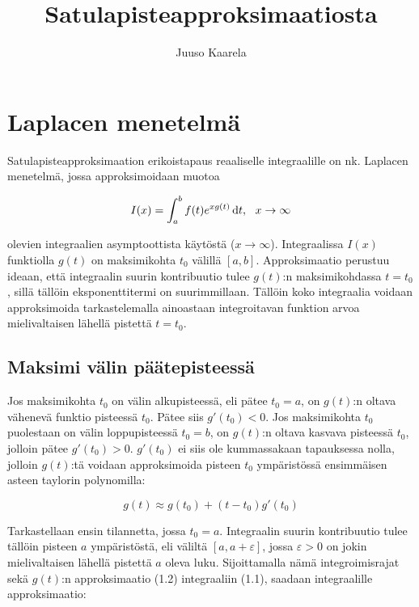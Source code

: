 \documentclass[]{article}
\title{Satulapisteapproksimaatiosta}
\author{Juuso Kaarela}
\numberwithin{equation}{section}
\begin{document}
\maketitle

\section{Laplacen menetelmä}

Satulapisteapproksimaation erikoistapaus reaaliselle integraalille on nk. Laplacen menetelmä, jossa approksimoidaan muotoa

\begin{equation}
	I(x) = \int_{a}^{b}f(t)e^{xg(t)}\odif{t}, \ \ x \to \infty
\end{equation}

olevien integraalien asymptoottista käytöstä ($x \to \infty$). Integraalissa $I(x)$ funktiolla $g(t)$ on maksimikohta $t_0$ välillä $[a, b]$. Approksimaatio perustuu ideaan, että integraalin suurin kontribuutio tulee $g(t)$:n maksimikohdassa $t = t_0$, sillä tällöin eksponenttitermi on suurimmillaan. Tällöin koko integraalia voidaan approksimoida tarkastelemalla ainoastaan integroitavan funktion arvoa mielivaltaisen lähellä pistettä $t = t_0$.

\subsection{Maksimi välin päätepisteessä}

Jos maksimikohta $t_0$ on välin alkupisteessä, eli pätee $t_0 = a$, on $g(t)$:n oltava vähenevä funktio pisteessä $t_0$. Pätee siis $g'(t_0) < 0$. Jos maksimikohta $t_0$ puolestaan on välin loppupisteessä $t_0 = b$, on $g(t)$:n oltava kasvava pisteessä $t_0$, jolloin pätee $g'(t_0) > 0$. $g'(t_0)$ ei siis ole kummassakaan tapauksessa nolla, jolloin $g(t)$:tä voidaan approksimoida pisteen $t_0$ ympäristössä ensimmäisen asteen taylorin polynomilla:

\begin{equation}
	g(t) \approx g(t_0) + (t - t_0)g'(t_0)
\end{equation}

Tarkastellaan ensin tilannetta, jossa $t_0 = a$. Integraalin suurin kontribuutio tulee tällöin pisteen $a$ ympäristöstä, eli väliltä $[a, a + \varepsilon]$, jossa $\varepsilon > 0$ on jokin mielivaltaisen lähellä pistettä $a$ oleva luku. Sijoittamalla nämä integroimisrajat sekä $g(t)$:n approksimaatio (1.2) integraaliin (1.1), saadaan integraalille approksimaatio:
\end{document}
